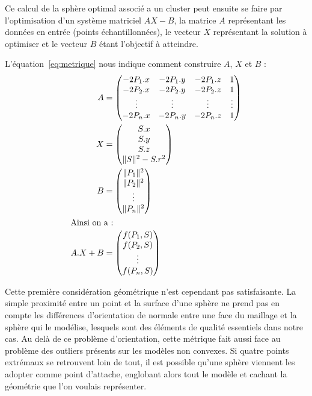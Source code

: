 \documentclass[10pt,a4paper,twoside, twocolumn]{report}
\begin{document}
Ce calcul de la sphère optimal associé a un cluster peut ensuite se faire par l'optimisation d'un système matriciel $AX-B$, la matrice $A$ représentant les données en entrée (points échantillonnées), le vecteur $X$ représentant la solution à optimiser et le vecteur $B$ étant l'objectif à atteindre.

L'équation~\ref{eq:metrique} nous indique comment construire $A$, $X$ et $B$ :
\begin{subequations}
\begin{align}
		A	&=	\begin{pmatrix}
						-2P_1.x & -2P_1.y & -2P_1.z & 1 			\\
						-2P_2.x & -2P_2.y & -2P_2.z & 1 			\\
						\vdots	& \vdots	&	\vdots	& \vdots	\\
						-2P_n.x & -2P_n.y & -2P_n.z & 1
					\end{pmatrix}																												\\
		X &=	\begin{pmatrix} S.x \\ S.y \\ S.z \\ \|S\|^2 - S.r^2 \end{pmatrix}	\\
		B	&=	\begin{pmatrix}
						\|P_1\|^2	\\
						\|P_2\|^2	\\
						\vdots			\\
						\|P_n\|^2
					\end{pmatrix}																												\\
\intertext{Ainsi on a :}
	A.X+B &= \begin{pmatrix}
						f(P_1, S)	\\
						f(P_2, S)	\\
						\vdots		\\
						f(P_n, S)
					\end{pmatrix}
\end{align}
\end{subequations}

Cette première considération géométrique n'est cependant pas satisfaisante. La simple proximité entre un point et la surface d'une sphère ne prend pas en compte les différences d'orientation de normale entre une face du maillage et la sphère qui le modélise, lesquels sont des éléments de qualité essentiels dans notre cas. Au delà de ce problème d'orientation, cette métrique fait aussi face au problème des outliers présents sur les modèles non convexes. Si quatre points extrémaux se retrouvent loin de tout, il est possible qu'une sphère viennent les adopter comme point d'attache, englobant alors tout le modèle et cachant la géométrie que l'on voulais représenter.
\end{document}

